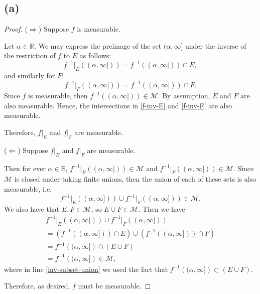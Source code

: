 \documentclass{article}
\newcommand{\R}{\mathbb{R}} %
\newcommand{\M}{\mathcal{M}} %
\begin{document}
\subsection*{(a)}
\begin{proof}
	($\Rightarrow$) Suppose $f$ is measurable. 
	
	Let $\alpha \in \R$. We may express the preimage of the set $(\alpha, \infty]$ under the inverse of the restriction of $f$ to $E$ as follows:
	\begin{equation}\label{f-inv-E}
		f^{-1}\big|_E \left((\alpha, \infty])\right) = f^{-1}\left((\alpha, \infty])\right) \cap E,
	\end{equation}
	and similarly for $F$:
	\begin{equation}\label{f-inv-F}
		f^{-1}\big|_F \left((\alpha, \infty])\right) = f^{-1}\left((\alpha, \infty])\right) \cap F.
	\end{equation}
	Since $f$ is measurable, then $f^{-1}\left((\alpha, \infty])\right) \in \M$. By assumption, $E$ and $F$ are also measurable. Hence, the intersections in \eqref{f-inv-E} and \eqref{f-inv-F} are also measurable. 
	
	Therefore, $f\big|_E$ and $f\big|_F$ are measurable.
	
	($\Leftarrow$) Suppose $f\big|_E$ and $f\big|_F$ are measurable.
	
	Then for ever $\alpha \in \R$, $f^{-1}\big|_E \left((\alpha, \infty])\right) \in \M$ and $f^{-1}\big|_F \left((\alpha, \infty])\right) \in \M$. Since $\M$ is closed under taking finite unions, then the union of each of these sets is also measurable, i.e.
	\begin{equation}
		f^{-1}\big|_E \left((\alpha, \infty])\right) \cup f^{-1}\big|_F \left((\alpha, \infty])\right) \in \M.
	\end{equation}
	We also have that $E, F \in \M$, so $E \cup F \in \M$. Then we have
	\begin{align}
		f^{-1}\big|_E \left((\alpha, \infty])\right) \cup f^{-1}\big|_F \left((\alpha, \infty])\right) \\= \left(f^{-1}\left((\alpha, \infty])\right) \cap E\right) \cup \left(f^{-1}\left((\alpha, \infty])\right) \cap F\right) \nonumber \\
		= f^{-1}\left((\alpha,\infty]\right) \cap (E \cup F) \\ 
		= f^{-1}\left((\alpha,\infty]\right) \in \M, \label{inv-subset-union}
	\end{align}
	where in line \eqref{inv-subset-union} we used the fact that $f^{-1}\left((\alpha,\infty]\right) \subset (E \cup F)$. 
	
	Therefore, as desired, $f$ must be measurable.
\end{proof}
\end{document}
